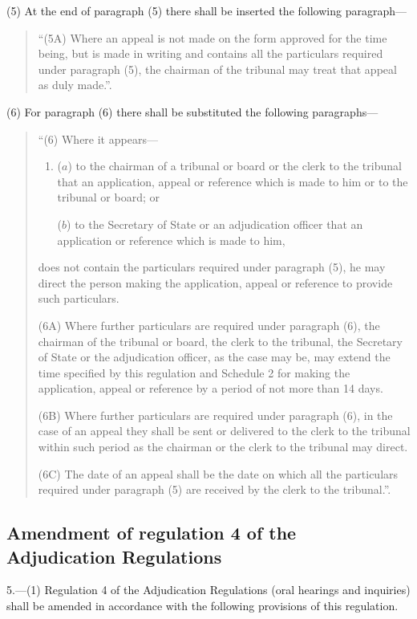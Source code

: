 \documentclass[a4paper]{article}
\begin{document}
(5) At the end of paragraph (5) there shall be inserted the following paragraph—
\begin{quotation}
“(5A) Where an appeal is not made on the form approved for the time being, but is made in writing and contains all the particulars required under paragraph (5), the chairman of the tribunal may treat that appeal as duly made.”.
\end{quotation}

(6) For paragraph (6) there shall be substituted the following paragraphs—
\begin{quotation}
“(6) Where it appears—
\begin{enumerate}\item[]
($a$) to the chairman of a tribunal or board or the clerk to the tribunal that an application, appeal or reference which is made to him or to the tribunal or board; or

($b$) to the Secretary of State or an adjudication officer that an application or reference which is made to him,
\end{enumerate}
does not contain the particulars required under paragraph (5), he may direct the person making the application, appeal or reference to provide such particulars.

(6A) Where further particulars are required under paragraph (6), the chairman of the tribunal or board, the clerk to the tribunal, the Secretary of State or the adjudication officer, as the case may be, may extend the time specified by this regulation and Schedule 2 for making the application, appeal or reference by a period of not more than 14 days.

(6B) Where further particulars are required under paragraph (6), in the case of an appeal they shall be sent or delivered to the clerk to the tribunal within such period as the chairman or the clerk to the tribunal may direct.

(6C) The date of an appeal shall be the date on which all the particulars required under paragraph (5) are received by the clerk to the tribunal.”.
\end{quotation}

\subsection[5. Amendment of regulation 4 of the Adjudication Regulations]{Amendment of regulation 4 of the Adjudication Regulations}

5.—(1) Regulation 4 of the Adjudication Regulations (oral hearings and inquiries) shall be amended in accordance with the following provisions of this regulation.
\end{document}
